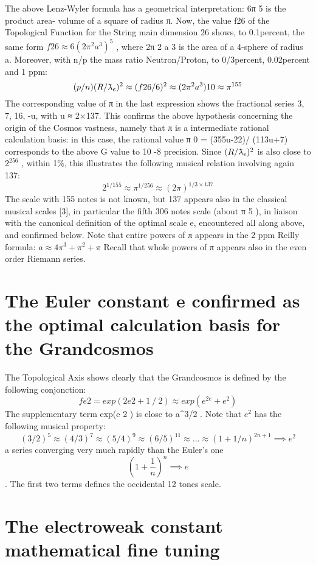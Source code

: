The above Lenz-Wyler formula has a geometrical interpretation: 6π 5 is the product area-
volume of a square of radius π. Now, the value f{26} of the Topological Function for the String
main dimension 26 shows, to 0.1{percent}, the same form $f{26} \approx 6(2\pi^{2} a^{3} )^{5}$ , where 2π 2 a 3 is the area of a
4-sphere of radius a. Moreover, with n/p the mass ratio Neutron/Proton, to 0/3{percent}, 0.02{percent} and 1
ppm:
$$(p/n) (R/\lambdabar_e )^{2} \approx (f{26}/6)^{2} \approx (2\pi^{2} a^{3} ) 10 \approx \pi^{155}$$
The corresponding value of π in the last expression shows the fractional series 3, 7, 16, -u, with u ≈
2×137. This confirms the above hypothesis concerning the origin of the Cosmos vastness, namely
that π is a intermediate rational calculation basis: in this case, the rational value π 0 = (355u-22)/
(113u+7) corresponds to the above G value to 10 -8 precision.
Since $(R/\lambdabar_e )^{2}$ is also close to $2^{256}$ , within 1\%, this illustrates the following musical relation
involving again 137:
$$2^{1/155} \approx \pi^{1/256} \approx (2\pi)^{1/3 \times 137}$$
The scale with 155 notes is not known, but 137 appears also in the classical musical scales [3], in
particular the fifth 306 notes scale (about π 5 ), in liaison with the canonical definition of the optimal
scale e, encountered all along above, and confirmed below.
Note that entire powers of π appears in the 2 ppm Reilly formula: $a \approx 4\pi^{3} + \pi^{2} + \pi$
Recall that whole powers of π appears also in the even order Riemann series.

\section {The Euler constant e confirmed as the optimal calculation basis for the Grandcosmos}

The Topological Axis shows clearly that the Grandcosmos is defined by the following
conjonction:
$$f{e 2 } = exp(2 e2 + 1⁄2 ) \approx exp(e^{2e} + e^{2} )$$
The supplementary term exp(e 2 ) is close to a^{3/2} . Note that $e^{2}$ has the following musical property:
$$(3/2)^{5} \approx (4/3)^{7} \approx (5/4)^{9} \approx (6/5)^{11} \approx ... \approx (1+1/n)^{2n+1} \implies e^{2}$$
a series converging very much rapidly than the Euler's one $$(1+\frac{1}{n})^{n} \implies e$$. The first two terms defines
the occidental 12 tones scale.

\section {The electroweak constant mathematical fine tuning}

